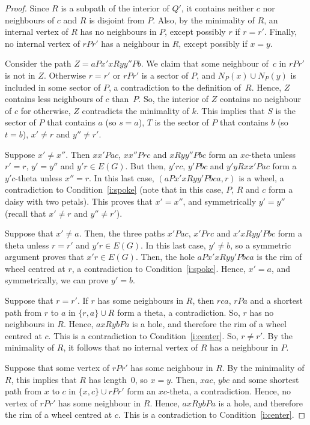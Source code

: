 \documentclass[11pt]{article}
\begin{document}
\begin{proof}
  Since $R$ is a subpath of the interior of $Q'$, it contains neither $c$ nor neighbours of $c$ and $R$ is disjoint from $P$.  Also, by the minimality of $R$, an internal vertex of $R$ has no neighbours in $P$, except possibly $r$ if $r=r'$.  Finally, no internal vertex of $r P r'$ has a neighbour in $R$,  except possibly if $x=y$.  
 
  Consider the path $Z = a P x' x R y y'' P b$.  
  We claim that some neighbour of~$c$  in $rPr'$ is not in $Z$.  
  Otherwise $r=r'$ or $rPr'$ is a sector of $P$, and $N_P(x) \cup N_P(y)$ is included in some sector of $P$, a contradiction to the definition of~$R$. 
  Hence, $Z$  contains less neighbours of $c$ than~$P$.  So, the interior of $Z$ contains no neighbour of $c$ for otherwise, $Z$ contradicts the minimality of $k$.  
  This implies that $S$ is the sector of $P$ that contains $a$ (so $s=a$), $T$ is the sector of $P$ that contains $b$ (so $t=b$), $x' \neq  r$ and $y'' \neq  r'$. 

  Suppose $x'\neq x''$.  
  Then $x x' P a c$, $x x'' P r c$ and $x R y y'' P b c$ form an $xc$-theta unless $r'=r$, $y'=y''$ and $y'r \in E(G)$.  
  But then, $y' r c$, $y' P b c$ and $y'y R x x' P a c$ form a $y'c$-theta unless $x''=r$. 
  In this last case, $(aPx'xRyy'Pbca, r)$ is a wheel, a contradiction to Condition~\ref{i:spoke} (note that in this case, $P$, $R$ and $c$ form a daisy with two petals). 
  This proves that $x'=x''$, and symmetrically $y'=y''$ (recall that $x' \neq  r$ and $y'' \neq  r'$).
  
  Suppose that $x'\neq a$.  
  Then, the three paths $x' P a c$, $x' P r c$ and $x' x R y y' P b c$ form a theta unless $r = r'$ and $y'r \in E(G)$.  In this last case, $y'\neq b$, so a symmetric argument proves that $x'r\in E(G)$.  
  Then, the hole $a P x' x R y y' P b c a$ is the rim of wheel centred at $r$, a contradiction to Condition~\ref{i:spoke}.  Hence, $x'=a$, and symmetrically, we can prove $y'=b$. 
  
  Suppose that $r=r'$.  If $r$ has some neighbours in $R$, then $rca$, $rPa$ and a shortest path from $r$ to $a$ in $\{r, a\} \cup R$ form a theta, a contradiction. So, $r$ has no neighbours in $R$.  
  Hence, $axRybPa$ is a hole, and therefore the rim of a wheel centred at $c$.  
  This is a contradiction to Condition~\ref{i:center}.  So, $r\neq r'$.  By the minimality of $R$, it follows that no internal vertex of $R$ has a neighbour in $P$.   
  
  Suppose that some vertex of $rPr'$  has some neighbour in $R$.  By the minimality of $R$, this implies that $R$ has length~0, so $x=y$.  Then, $xac$, $ybc$ and some shortest path from $x$ to $c$ in $\{x, c\} \cup rPr'$ form an $xc$-theta, a contradiction. Hence, no vertex of $rPr'$ has some neighbour in $R$. 
  Hence, $axRybPa$ is a hole,  and therefore the rim of a wheel centred at $c$.  This is a contradiction to Condition~\ref{i:center}. 
\end{proof}
\end{document}
